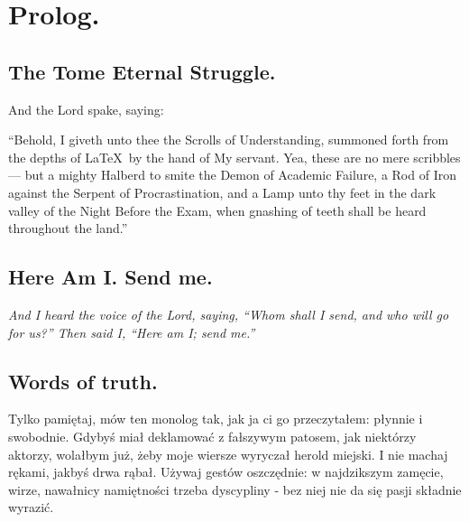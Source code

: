 \chapter*{Prolog.}
\section*{The Tome Eternal Struggle.}

And the Lord spake, saying:

“Behold, I giveth unto thee the Scrolls of Understanding, summoned forth from the depths of \LaTeX\ by the hand of My servant. Yea, these are no mere scribbles — but a mighty Halberd to smite the Demon of Academic Failure, a Rod of Iron against the Serpent of Procrastination, and a Lamp unto thy feet in the dark valley of the Night Before the Exam, when gnashing of teeth shall be heard throughout the land.”

\section*{Here Am I. Send me.}
\textit{And I heard the voice of the Lord, saying,
“Whom shall I send, and who will go for us?”
Then said I, “Here am I; send me.”} 

\section*{Words of truth.}
Tylko pamiętaj, mów ten monolog tak, jak ja ci go przeczytałem: płynnie i swobodnie. Gdybyś miał deklamować z fałszywym patosem, jak niektórzy aktorzy, wolałbym już, żeby moje wiersze wyryczał herold miejski. I nie machaj rękami, jakbyś drwa rąbał. Używaj gestów oszczędnie: w najdzikszym zamęcie, wirze, nawałnicy namiętności trzeba dyscypliny - bez niej nie da się pasji składnie wyrazić.


